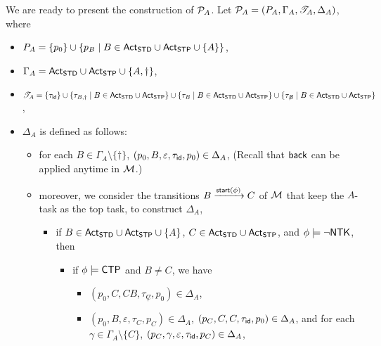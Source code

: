 We are ready to present the construction of ${\mathcal{P} }_A$. Let ${\mathcal{P} }_A = (P_A, \Gamma_A, {\mathscr{T} }_A, \Delta_A)$, where 
\begin{itemize}
\item $P_{A} = \{p_0\}\cup\{ p_{B}\mid B \in  {\sf Act}_{\sf STD} \cup {\sf Act}_{\sf STP} \cup \{A\}\}$,
\item $\Gamma_{A} = {\sf Act}_{\sf STD} \cup {\sf Act}_{\sf STP} \cup \{A, \dag\}$, 
\item ${\mathscr{T} }_A = \{\tau_{\mathsf{id}} \}\cup \{\tau_{B, \dag} \mid B \in {\sf Act}_{\sf STD} \cup {\sf Act}_{\sf STP} \} \cup \{\tau_{B} \mid B \in {\sf Act}_{\sf STD} \cup {\sf Act}_{\sf STP}\}  \cup \{\tau_{\not B} \mid B \in {\sf Act}_{\sf STD} \cup {\sf Act}_{\sf STP}\}$, 
\item $\Delta_{A}$ is defined as follows:
        \begin{itemize}
            \item for each $B \in \Gamma_{A} \setminus \{\dag\}$, $(p_0, B, \varepsilon, \tau_{\mathsf{id}}, p_0) \in \Delta_{A}$, (Recall that ${\mathsf{back} }$ can be applied anytime in ${\mathcal{M} }$.)
	    \item moreover, we consider the transitions $B \xrightarrow{{\mathsf{start} }(\phi)} C$ of ${\mathcal{M} }$ that keep the $A$-task as the top task, to construct $\Delta_A$, 
			\begin{itemize}
				\item if $B \in {\sf Act}_{\sf STD} \cup {\sf Act}_{\sf STP} \cup \{A\}$, $C \in {\sf Act}_{\sf STD} \cup {\sf Act}_{\sf STP}$, and $\phi \models \neg {\sf NTK}$, then 
				\begin{itemize}
				\item if $\phi \models {\sf CTP}$ and $B \neq C$, we have 
				\begin{itemize}
					\item $(p_0, C, CB, \tau_{\not C}, p_0) \in \Delta_{A}$, 
					\item $(p_0, B, \varepsilon, \tau_{C}, p_C) \in \Delta_{A}$, $(p_C, C, C, \tau_{\mathsf{id}}, p_0)  \in \Delta_{A}$, and for each $\gamma \in \Gamma_A \setminus \{C\}$, $(p_C, \gamma, \varepsilon, \tau_{\mathsf{id}}, p_C) \in \Delta_{A}$, 

\end{itemize}
\end{itemize}
\end{itemize}
\end{itemize}
\end{itemize}
